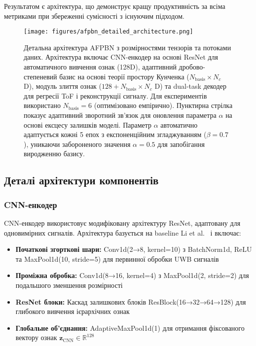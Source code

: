 \documentclass[12pt,a4paper]{article}
\begin{document}
Результатом є архітектура, що демонструє кращу продуктивність за всіма метриками при збереженні сумісності з існуючим підходом.

\begin{sidewaysfigure}
	\centering
	\texttt{[image: figures/afpbn\_detailed\_architecture.png]}
	\caption{Детальна архітектура AFPBN з розмірностями тензорів та потоками даних. Архітектура включає CNN-енкодер на основі ResNet для автоматичного вивчення ознак (128D), адаптивний дробово-степеневий базис на основі теорії простору Кунченка ($N_{\text{basis}} \times N_c$ D), модуль злиття ознак ($128 + N_{\text{basis}} \times N_c$ D) та dual-task декодер для регресії ToF і реконструкції сигналу. Для експериментів використано $N_{\text{basis}} = 6$ (оптимізовано емпірично). Пунктирна стрілка показує адаптивний зворотний зв'язок для оновлення параметра $\alpha$ на основі ексцесу залишків моделі. Параметр $\alpha$ автоматично адаптується кожні 5 епох з експоненційним згладжуванням ($\beta = 0.7$), уникаючи забороненого значення $\alpha = 0.5$ для запобігання виродженню базису.}
	\label{fig:afpbn_detailed}
	
\end{sidewaysfigure}

\subsection{Деталі архітектури компонентів}
\label{sec:component_details}

\subsubsection{CNN-енкодер}
CNN-енкодер використовує модифіковану архітектуру ResNet, адаптовану для одновимірних сигналів. Архітектура базується на baseline Li et al.~\cite{li2021multi} і включає:

\begin{itemize}
	\item \textbf{Початкові згорткові шари:} Conv1d(2→8, kernel=10) з BatchNorm1d, ReLU та MaxPool1d(10, stride=5) для первинної обробки UWB сигналів
	\item \textbf{Проміжна обробка:} Conv1d(8→16, kernel=4) з MaxPool1d(2, stride=2) для подальшого зменшення розмірності
	\item \textbf{ResNet блоки:} Каскад залишкових блоків ResBlock(16→32→64→128) для глибокого вивчення ієрархічних ознак
	\item \textbf{Глобальне об'єднання:} AdaptiveMaxPool1d(1) для отримання фіксованого вектору ознак $\mathbf{z}_{\text{CNN}} \in \mathbb{R}^{128}$
\end{itemize}
\end{document}
